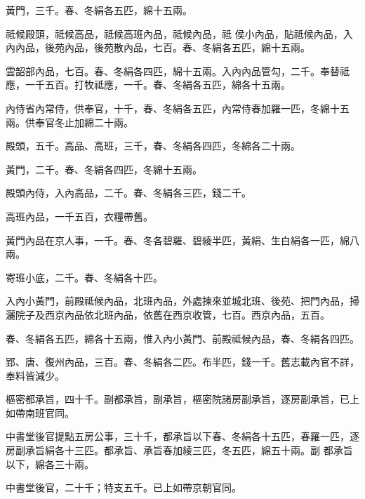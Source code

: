 \begin{pinyinscope}
 黃門，三千。春、冬絹各五匹，綿十五兩。



 祗候殿頭，祗候高品，祗候高班內品，祗候內品，祗
 侯小內品，貼祗候內品，入內內品，後苑內品，後苑散內品，七百。春、冬絹各五匹，綿十五兩。



 雲韶部內品，七百。春、冬絹各四匹，綿十五兩。入內內品管勾，二千。奉替祗應，一千五百。打牧祗應，一千。春、冬絹各五匹，綿各十五兩。



 內侍省內常侍，供奉官，十千，春、冬絹各五匹，內常侍春加羅一匹，冬綿十五兩。供奉官冬止加綿二十兩。



 殿頭，五千。高品、高班，三千，春、冬絹各四匹，冬綿各二十兩。



 黃門，二千。春、冬絹各四匹，冬綿十五兩。



 殿頭內侍，入內高品，二千。春、冬絹各三匹，錢二千。



 高班內品，一千五百，衣糧帶舊。



 黃門內品在京人事，一千。春、冬各碧羅、碧綾半匹，黃絹、生白絹各一匹，綿八兩。



 寄班小底，二千。春、冬絹各十匹。



 入內小黃門，前殿祗候內品，北班內品，外處揀來並城北班、後苑、把門內品，掃灑院子及西京內品依北班內品，依舊在西京收管，七百。西京內品，五百。



 春、冬絹各五匹，綿各十五兩，惟入內小黃門、前殿祗候內品，春、冬絹各四匹。



 郢、唐、復州內品，三百。春、冬絹各二匹。布半匹，錢一千。舊志載內官不詳，奉料皆減少。



 樞密都承旨，四十千。副都承旨，副承旨，樞密院諸房副承旨，逐房副承旨，已上如帶南班官同。



 中書堂後官提點五房公事，三十千，都承旨以下春、冬絹各十五匹，春羅一匹，逐房副承旨絹各十三匹。都承旨、承旨春加綾三匹，冬五匹，綿五十兩。副
 都承旨以下，綿各三十兩。



 中書堂後官，二十千；特支五千。已上如帶京朝官同。




\end{pinyinscope}
